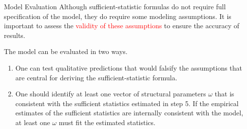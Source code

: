 \documentclass{beamer}
\begin{document}
\begin{frame}{Model Evaluation}
	Although sufficient-statistic formulas do not require full specification of the model, they do require some modeling assumptions. It is important to assess the \textcolor{red}{validity of these assumptions} to ensure the accuracy of results.
	\medskip

	The model can be evaluated in two ways.
	\begin{enumerate}
		\item One can test qualitative predictions that would falsify the assumptions that are central for deriving the sufficient-statistic formula.
		\item One should identify at least one vector of structural parameters $\omega$ that is consistent with the sufficient statistics estimated in step 5. If the empirical estimates of the sufficient statistics are internally consistent with the model, at least one $\omega$ must fit the estimated
		statistics.
	\end{enumerate}
\end{frame}
\end{document}
